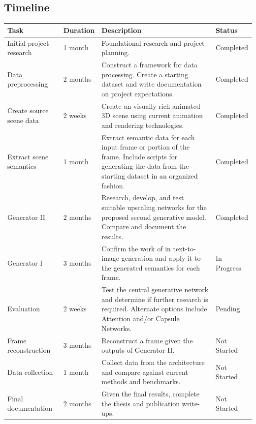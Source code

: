 \documentclass{article}
\begin{document}
\subsection{Timeline}
\label{subsec:timeline}
\begin{center}
\def\arraystretch{2.5}
\begin{tabular}{ | m{} | m{} | m{} | m{} | } 
\hline
\textbf{Task} & \textbf{Duration} & \textbf{Description} & \textbf{Status} \\ 
\hline
\hline
Initial project research & 1 month & Foundational research and project planning. & Completed \\
\hline
Data preprocessing & 2 months & Construct a framework for data processing. Create a starting dataset and write documentation on project expectations. & Completed\\
\hline
Create source scene data & 2 weeks & Create an visually-rich animated 3D scene using current animation and rendering technologies. & Completed\\
\hline
Extract scene semantics & 1 month & Extract semantic data for each input frame or portion of the frame. Include scripts for generating the data from the starting dataset in an organized fashion. & Completed \\
\hline
Generator II & 2 months & Research, develop, and test suitable upscaling networks for the proposed second generative model. Compare and document the results. & Completed \\
\hline
Generator I & 3 months & Confirm the work of \cite{leica} in text-to-image generation and apply it to the generated semantics for each frame. & In Progress \\
\hline
Evaluation & 2 weeks & Test the central generative network and determine if further research is required. Alternate options include Attention and/or Capsule Networks. & Pending \\
\hline
Frame reconstruction & 3 months & Reconstruct a frame given the outputs of Generator II. & Not Started \\
\hline
Data collection & 1 month & Collect data from the architecture and compare against current methods and benchmarks. & Not Started\\
\hline
Final documentation & 2 months & Given the final results, complete the thesis and publication write-ups. & Not Started\\
\hline
\end{tabular}
\end{center}

\nocite{pixel_cnn}



\end{document}
